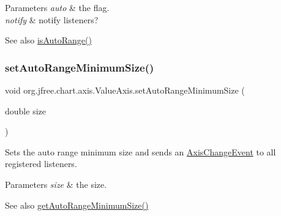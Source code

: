\begin{DoxyParams}{Parameters}
{\em auto} & the flag. \\
\hline
{\em notify} & notify listeners?\\
\hline
\end{DoxyParams}
\begin{DoxySeeAlso}{See also}
\mbox{\hyperlink{classorg_1_1jfree_1_1chart_1_1axis_1_1_value_axis_a6387bb31d194a542d27329ae8e0e84b2}{is\+Auto\+Range()}} 
\end{DoxySeeAlso}
\mbox{\label{classorg_1_1jfree_1_1chart_1_1axis_1_1_value_axis_a70efada90ae6f8ed6f4cc34052adec3f}} 
\subsubsection{\texorpdfstring{set\+Auto\+Range\+Minimum\+Size()}{setAutoRangeMinimumSize()}\hspace{0.1cm}{\footnotesize\ttfamily [1/2]}}
{\footnotesize\ttfamily void org.\+jfree.\+chart.\+axis.\+Value\+Axis.\+set\+Auto\+Range\+Minimum\+Size (\begin{DoxyParamCaption}\item[{double}]{size }\end{DoxyParamCaption})}

Sets the auto range minimum size and sends an \mbox{\hyperlink{}{Axis\+Change\+Event}} to all registered listeners.


\begin{DoxyParams}{Parameters}
{\em size} & the size.\\
\hline
\end{DoxyParams}
\begin{DoxySeeAlso}{See also}
\mbox{\hyperlink{classorg_1_1jfree_1_1chart_1_1axis_1_1_value_axis_a226a4b8af4f659deaaf5e1dade76533b}{get\+Auto\+Range\+Minimum\+Size()}} 
\end{DoxySeeAlso}
\mbox{\label{classorg_1_1jfree_1_1chart_1_1axis_1_1_value_axis_a7da4ee922ece37d540898cacf8b5bdae}} 
